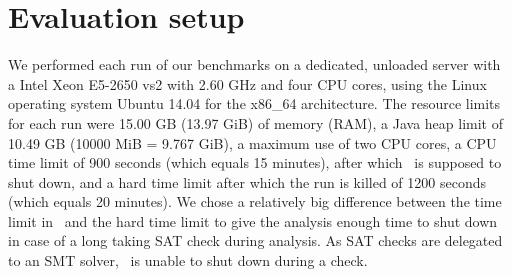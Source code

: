 \section{Evaluation setup}
We performed each run of our benchmarks on a dedicated, unloaded server with a Intel Xeon E5-2650 vs2 with 2.60 GHz and four CPU cores, using the Linux operating system Ubuntu 14.04 for the x86\_64 architecture.
The resource limits for each run were 15.00 GB (13.97 GiB) of memory (RAM), a Java heap limit of 10.49 GB (10000 MiB = 9.767 GiB),
a maximum use of two CPU cores,
a CPU time limit of 900 seconds (which equals 15 minutes), after which \cpaChecker\ is supposed to shut down,
and a hard time limit after which the run is killed of 1200 seconds (which equals 20 minutes).
We chose a relatively big difference between the time limit in \cpaChecker\ and the hard time limit to give the analysis enough time to shut down in case of a long taking SAT check during analysis.
As SAT checks are delegated to an SMT solver, \cpaChecker\ is unable to shut down during a check.

